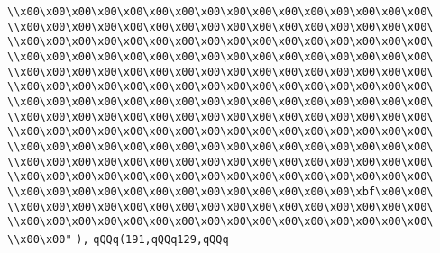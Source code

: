 \verb|\\x00\x00\x00\x00\x00\x00\x00\x00\x00\x00\x00\x00\x00\x00\x00\x00\|\newline
\verb|\\x00\x00\x00\x00\x00\x00\x00\x00\x00\x00\x00\x00\x00\x00\x00\x00\|\newline
\verb|\\x00\x00\x00\x00\x00\x00\x00\x00\x00\x00\x00\x00\x00\x00\x00\x00\|\newline
\verb|\\x00\x00\x00\x00\x00\x00\x00\x00\x00\x00\x00\x00\x00\x00\x00\x00\|\newline
\verb|\\x00\x00\x00\x00\x00\x00\x00\x00\x00\x00\x00\x00\x00\x00\x00\x00\|\newline
\verb|\\x00\x00\x00\x00\x00\x00\x00\x00\x00\x00\x00\x00\x00\x00\x00\x00\|\newline
\verb|\\x00\x00\x00\x00\x00\x00\x00\x00\x00\x00\x00\x00\x00\x00\x00\x00\|\newline
\verb|\\x00\x00\x00\x00\x00\x00\x00\x00\x00\x00\x00\x00\x00\x00\x00\x00\|\newline
\verb|\\x00\x00\x00\x00\x00\x00\x00\x00\x00\x00\x00\x00\x00\x00\x00\x00\|\newline
\verb|\\x00\x00\x00\x00\x00\x00\x00\x00\x00\x00\x00\x00\x00\x00\x00\x00\|\newline
\verb|\\x00\x00\x00\x00\x00\x00\x00\x00\x00\x00\x00\x00\x00\x00\x00\x00\|\newline
\verb|\\x00\x00\x00\x00\x00\x00\x00\x00\x00\x00\x00\x00\x00\x00\x00\x00\|\newline
\verb|\\x00\x00\x00\x00\x00\x00\x00\x00\x00\x00\x00\x00\x00\xbf\x00\x00\|\newline
\verb|\\x00\x00\x00\x00\x00\x00\x00\x00\x00\x00\x00\x00\x00\x00\x00\x00\|\newline
\verb|\\x00\x00\x00\x00\x00\x00\x00\x00\x00\x00\x00\x00\x00\x00\x00\x00\|\newline
\verb|\\x00\x00"|\newline
\verb|),|\newline
\verb|qQQq(191,qQQq129,qQQq|\newline
